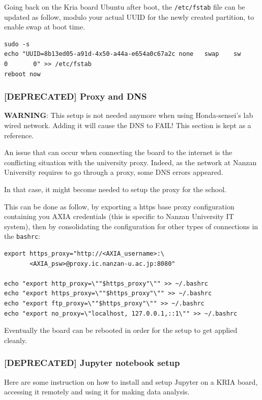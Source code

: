 \documentclass[10pt]{article}
\begin{document}
Going back on the Kria board Ubuntu after boot, the \texttt{/etc/fstab} file can be
updated as follow, modulo your actual UUID for the newly created partition, to
enable swap at boot time.
\begin{verbatim}
sudo -s
echo "UUID=8b13ed05-a91d-4x50-a44a-e654a0c67a2c none   swap    sw      0       0" >> /etc/fstab
reboot now
\end{verbatim}

\subsubsection{[DEPRECATED] Proxy and DNS}
\label{sec:org66baff4}
\begin{tcolorbox}[colback=orange!5!white,colframe=orange!75!black]
\textbf{WARNING}: This setup is not needed anymore when using Honda-sensei's lab
wired network.
Adding it will cause the DNS to FAIL!
This section is kept as a reference.
\end{tcolorbox}
An issue that can occur when connecting the board to the internet is the
conflicting situation with the university proxy.
Indeed, as the network at Nanzan University requires to go through a proxy,
some DNS errors appeared.

In that case, it might become needed to setup the proxy for the school.

This can be done as follow, by exporting a https base proxy configuration
containing you AXIA credentials (this is specific to Nanzan University IT system),
then by consolidating the configuration for other types of connections in the \texttt{bashrc}:

\begin{verbatim}
export https_proxy="http://<AXIA_username>:\
       <AXIA_psw>@proxy.ic.nanzan-u.ac.jp:8080"

echo "export http_proxy=\""$https_proxy"\"" >> ~/.bashrc
echo "export https_proxy=\""$https_proxy"\"" >> ~/.bashrc
echo "export ftp_proxy=\""$https_proxy"\"" >> ~/.bashrc
echo "export no_proxy=\"localhost, 127.0.0.1,::1\"" >> ~/.bashrc
\end{verbatim}

Eventually the board can be rebooted in order for the setup to get applied cleanly.

\subsubsection{[DEPRECATED] Jupyter notebook setup}
\label{sec:org96fe0cb}
Here are some instruction on how to install and setup Jupyter on a KRIA board,
accessing it remotely and using it for making data analysis.
\end{document}
